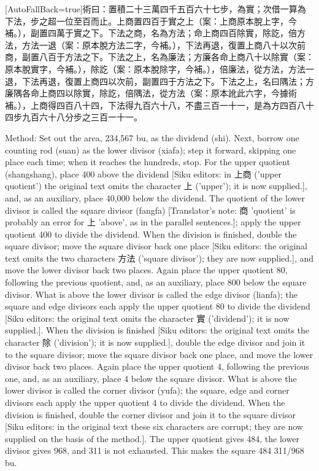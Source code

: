 \documentclass[11pt]{article}
\newcommand{\unitlabel}[1]{\marginpar{\raggedleft\tiny\color{gray}#1}}
\newenvironment{unitzh}{\par\CJKfontspec{Noto Serif CJK SC}[AutoFallBack=true]\large\linespread{1.25}\selectfont}{\par}
\newenvironment{uniten}{\par\small\color{black!85}}{\par\medskip}
\begin{document}
\begin{unitzh}\unitlabel{sunzi-004.4}術曰：置積二十三萬四千五百六十七步，為實；次借一算為下法，步之超一位至百而止。上商置四百于實之上（案：上商原本脫上字，今補。），副置四萬于實之下。下法之商，名為方法；命上商四百除實，除訖，倍方法，方法一退（案：原本脫方法二字，今補。），下法再退，復置上商八十以次前商，副置八百于方法之下。下法之上，名為廉法；方廉各命上商八十以除實（案：原本脫實字，今補。），除訖（案：原本脫除字，今補。），倍廉法，從方法，方法一退，下法再退，復置上商四以次前，副置四于方法之下。下法之上，名曰隅法；方廉隅各命上商四以除實，除訖，倍隅法，從方法（案：原本訛此六字，今據術補。），上商得四百八十四，下法得九百六十八，不盡三百一十一，是為方四百八十四步九百六十八分步之三百一十一。\end{unitzh}
\begin{uniten}Method: Set out the area, 234,567 bu, as the dividend (shi). Next, borrow one counting rod (suan) as the lower divisor (xiafa); step it forward, skipping one place each time; when it reaches the hundreds, stop. For the upper quotient (shangshang), place 400 above the dividend [Siku editors: in 上商 ('upper quotient') the original text omits the character 上 ('upper'); it is now supplied.], and, as an auxiliary, place 40,000 below the dividend. The quotient of the lower divisor is called the square divisor (fangfa) [Translator's note: 商 'quotient' is probably an error for 上 'above', as in the parallel sentences.]; apply the upper quotient 400 to divide the dividend. When the division is finished, double the square divisor; move the square divisor back one place [Siku editors: the original text omits the two characters 方法 ('square divisor'); they are now supplied.], and move the lower divisor back two places. Again place the upper quotient 80, following the previous quotient, and, as an auxiliary, place 800 below the square divisor. What is above the lower divisor is called the edge divisor (lianfa); the square and edge divisors each apply the upper quotient 80 to divide the dividend [Siku editors: the original text omits the character 實 ('dividend'); it is now supplied.]. When the division is finished [Siku editors: the original text omits the character 除 ('division'); it is now supplied.], double the edge divisor and join it to the square divisor; move the square divisor back one place, and move the lower divisor back two places. Again place the upper quotient 4, following the previous one, and, as an auxiliary, place 4 below the square divisor. What is above the lower divisor is called the corner divisor (yufa); the square, edge and corner divisors each apply the upper quotient 4 to divide the dividend. When the division is finished, double the corner divisor and join it to the square divisor [Siku editors: in the original text these six characters are corrupt; they are now supplied on the basis of the method.]. The upper quotient gives 484, the lower divisor gives 968, and 311 is not exhausted. This makes the square 484 311/968 bu.\end{uniten}
\end{document}

